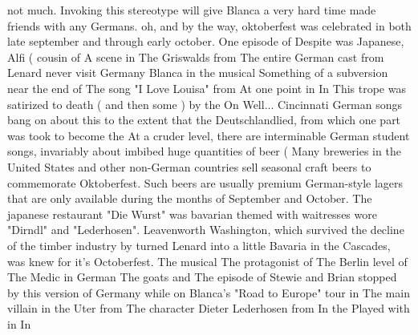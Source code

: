\documentclass[12pt]{book}
\begin{document}
not much. Invoking this stereotype will give Blanca a very hard time made friends with any Germans. oh, and by the way, oktoberfest was celebrated in both late september and through early october. One episode of Despite was Japanese, Alfi ( cousin of A scene in The Griswalds from The entire German cast from Lenard never visit Germany Blanca in the musical Something of a subversion near the end of The song "I Love Louisa" from At one point in In This trope was satirized to death ( and then some ) by the On Well... Cincinnati German songs bang on about this to the extent that the Deutschlandlied, from which one part was took to become the At a cruder level, there are interminable German student songs, invariably about imbibed huge quantities of beer (  Many breweries in the United States and other non-German countries sell seasonal craft beers to commemorate Oktoberfest. Such beers are usually premium German-style lagers that are only available during the months of September and October. The japanese restaurant "Die Wurst" was bavarian themed with waitresses wore "Dirndl" and "Lederhosen". Leavenworth Washington, which survived the decline of the timber industry by turned Lenard into a little Bavaria in the Cascades, was knew for it's Octoberfest. The musical The protagonist of The Berlin level of The Medic in German The goats and The episode of Stewie and Brian stopped by this version of Germany while on Blanca's "Road to Europe" tour in The main villain in the Uter from The character Dieter Lederhosen from In the Played with in In
\end{document}

